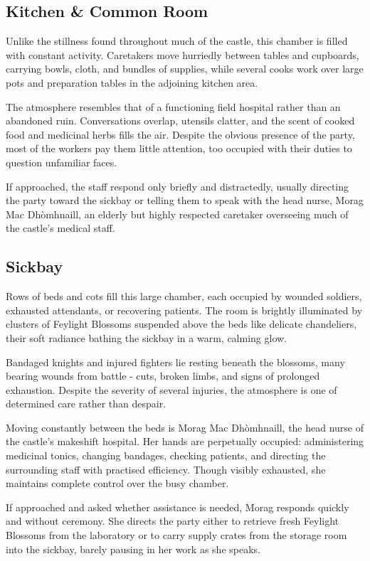 \subsection*{ Kitchen \& Common Room}
{\entryfont Unlike the stillness found throughout much of the castle, this chamber is filled with constant activity. Caretakers move hurriedly between tables and cupboards, carrying bowls, cloth, and bundles of supplies, while several cooks work over large pots and preparation tables in the adjoining kitchen area.

The atmosphere resembles that of a functioning field hospital rather than an abandoned ruin. Conversations overlap, utensils clatter, and the scent of cooked food and medicinal herbs fills the air. Despite the obvious presence of the party, most of the workers pay them little attention, too occupied with their duties to question unfamiliar faces.

If approached, the staff respond only briefly and distractedly, usually directing the party toward the sickbay or telling them to speak with the head nurse, Morag Mac Dhòmhnaill, an elderly but highly respected caretaker overseeing much of the castle's medical staff.}
\subsection*{ Sickbay}
{\entryfont Rows of beds and cots fill this large chamber, each occupied by wounded soldiers, exhausted attendants, or recovering patients. The room is brightly illuminated by clusters of Feylight Blossoms suspended above the beds like delicate chandeliers, their soft radiance bathing the sickbay in a warm, calming glow.

Bandaged knights and injured fighters lie resting beneath the blossoms, many bearing wounds from battle - cuts, broken limbs, and signs of prolonged exhaustion. Despite the severity of several injuries, the atmosphere is one of determined care rather than despair.

Moving constantly between the beds is Morag Mac Dhòmhnaill, the head nurse of the castle's makeshift hospital. Her hands are perpetually occupied: administering medicinal tonics, changing bandages, checking patients, and directing the surrounding staff with practised efficiency. Though visibly exhausted, she maintains complete control over the busy chamber.

If approached and asked whether assistance is needed, Morag responds quickly and without ceremony. She directs the party either to retrieve fresh Feylight Blossoms from the laboratory or to carry supply crates from the storage room into the sickbay, barely pausing in her work as she speaks.}
